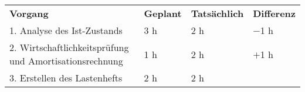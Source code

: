 \begin{tabularx}{\textwidth}{Xlll}
\rowcolor{heading}\textbf{Vorgang} & \textbf{Geplant} & \textbf{Tatsächlich} & \textbf{Differenz} \\
1. Analyse des Ist-Zustands & 3 h   & 2 h   & $-$1 h \\
\rowcolor{odd}2. Wirtschaftlichkeitsprüfung und Amortisationsrechnung & 1 h   & 2 h   & $+$1 h\\
3. Erstellen des Lastenhefts & 2 h   & 2 h   &  \\
\end{tabularx}